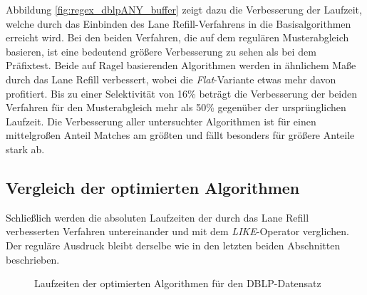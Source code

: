 Abbildung \ref{fig:regex_dblpANY_buffer} zeigt dazu die Verbesserung der Laufzeit, welche durch das Einbinden des Lane Refill-Verfahrens in die Basisalgorithmen erreicht wird.
Bei den beiden Verfahren, die auf dem regulären Musterabgleich basieren, ist eine bedeutend größere Verbesserung zu sehen	 als bei dem Präfixtest.
Beide auf Ragel basierenden Algorithmen werden in ähnlichem Maße durch das Lane Refill verbessert, wobei die \emph{Flat}-Variante etwas mehr davon profitiert.
Bis zu einer Selektivität von 16\% beträgt die Verbesserung der beiden Verfahren für den Musterabgleich mehr als 50\% gegenüber der ursprünglichen Laufzeit.
Die Verbesserung aller untersuchter Algorithmen ist für einen mittelgroßen Anteil Matches am größten und fällt besonders für größere Anteile stark ab.

\subsection{Vergleich der optimierten Algorithmen}
\label{sec:regex_evaluation_beobachtung_3}

Schließlich werden die absoluten Laufzeiten der durch das Lane Refill verbesserten Verfahren untereinander und mit dem \emph{LIKE}-Operator verglichen.
Der reguläre Ausdruck bleibt derselbe wie in den letzten beiden Abschnitten beschrieben.

\begin{figure}[]
	\centering
	\caption{Laufzeiten der optimierten Algorithmen für den DBLP-Datensatz}
	\label{fig:regex_dblpANY_optimal}
\end{figure}

